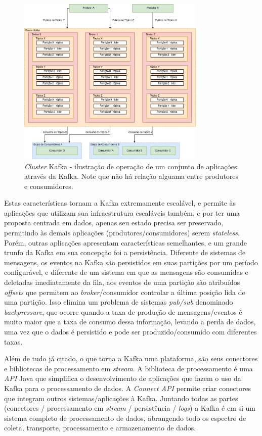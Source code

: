 \documentclass[12pt]{article}
\begin{document}
\begin{figure}[ht]
    \centering
    \includegraphics[width=0.8\textwidth]{images/kafkaCluster.jpg}
    \caption{\textit{Cluster} Kafka - ilustração de operação de um conjunto de aplicações através da Kafka. Note que não há relação alguama entre produtores e consumidores.}
    \label{fig:kafkaCluster}
\end{figure}

Estas características tornam a Kafka extremamente escalável, e permite às aplicações que utilizam sua infraestrutura escaláveis também, e por ter uma proposta centrada em dados, apenas seu estado precisa ser preservado, permitindo às demais aplicações (produtores/consumidores) serem \textit{stateless}. Porém, outras aplicações apresentam características semelhantes, e um grande trunfo da Kafka em sua concepção foi a persistência. Diferente de sistemas de mensagens, os eventos na Kafka são persistidos em suas partições por um período configurável, e diferente de um sistema em que as mensagens são consumidas e deletadas imediatamente da fila, aos eventos de uma partição são atribuídos \textit{offsets} que permitem ao \textit{broker}/consumidor controlar a última posição lida de uma partição. Isso elimina um problema de sistemas \textit{pub/sub} denominado \textit{backpressure}, que ocorre quando a taxa de produção de mensagens/eventos é muito maior que a taxa de consumo dessa informação, levando a perda de dados, uma vez que o dados é persistido e pode ser produzido/consumido com diferentes taxas.

Além de tudo já citado, o que torna a Kafka uma plataforma, são seus conectores e bibliotecas de processamento em \textit{stream}. A biblioteca de processamento é uma \textit{API} Java que simplifica o desenvolvimento de aplicações que fazem o uso da Kafka para o processamento de dados. A \textit{Connect API} permite criar conectores que integram outros sistemas/aplicações à Kafka. Juntando todas as partes (conectores / processamento em \textit{stream} / persistência / \textit{logs}) a Kafka é em si um sistema completo de processamento de dados, abrangendo todo os espectro de coleta, transporte, processamento e armazenamento de dados.
\end{document}

